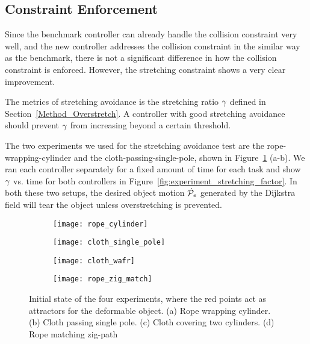 \subsection{Constraint Enforcement}
\label{Results: Object Stretching Avoidance}

Since the benchmark controller can already handle the collision constraint very well, and the new controller addresses the collision constraint in the similar way as the benchmark, there is not a significant difference in how the collision constraint is enforced. However, the stretching constraint shows a very clear improvement.

The metrics of stretching avoidance is the stretching ratio $\gamma$ defined in Section~\ref{Method_Overstretch}. A controller with good stretching avoidance should prevent $\gamma$ from increasing beyond a certain threshold.

The two experiments we used for the stretching avoidance test are the rope-wrapping-cylinder and the cloth-passing-single-pole, shown in Figure~\ref{fig:experimental_setup_scene} (a-b). We ran each controller separately for a fixed amount of time for each task and show $\gamma$ vs. time for both controllers in Figure~\ref{fig:experiment_stretching_factor}. In both these two setups, the desired object motion $\dot{\mathcal{P}}_e$ generated by the Dijkstra field will tear the object unless overstretching is prevented.

\begin{figure}[h]
    \centering
    \begin{subfigure}{0.248\textwidth}
        \centering
        \texttt{[image: rope\_cylinder]}%
        \caption{}
    \end{subfigure}\hfill
    \begin{subfigure}{0.248\textwidth}
        \centering
        \texttt{[image: cloth\_single\_pole]}%
        \caption{}
    \end{subfigure}\hfill
    \begin{subfigure}{0.248\textwidth}
        \centering
        \texttt{[image: cloth\_wafr]}%
        \caption{}
    \end{subfigure}\hfill
    \begin{subfigure}{0.248\textwidth}
        \centering
        \texttt{[image: rope\_zig\_match]}%
        \caption{}
    \end{subfigure}%
    \caption{Initial state of the four experiments, where the red points act as attractors for the deformable object. (a) Rope wrapping cylinder. (b) Cloth passing single pole. (c) Cloth covering two cylinders. (d) Rope matching zig-path}
    \label{fig:experimental_setup_scene}
\end{figure}

